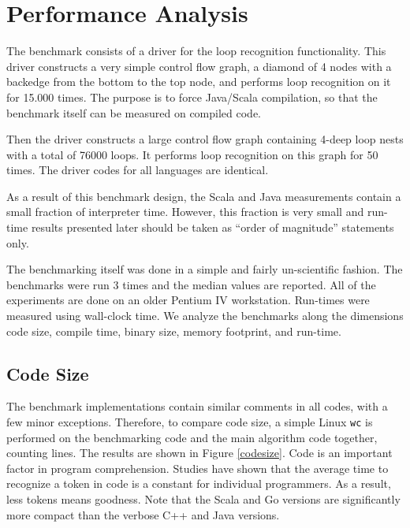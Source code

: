 \section{Performance Analysis}
\label{benchmark}

The benchmark consists of a driver for the loop recognition
functionality. This driver constructs a very simple control flow
graph, a diamond of 4 nodes with a backedge from the bottom to the
top node, and performs loop recognition on it for 15.000 times. 
The purpose is to force Java/Scala compilation, so that the benchmark 
itself can be measured on compiled code. 

Then the driver constructs a
large control flow graph containing 4-deep loop nests with a total of
76000 loops. It performs loop recognition on this graph for 50
times. The driver codes for all languages are identical.

As a result of this benchmark design, the Scala and Java measurements
contain a small fraction of interpreter time. However, this fraction
is very small and run-time results presented later should be
taken as ``order of magnitude'' statements only.

The benchmarking itself was done in a simple and fairly 
un-scientific fashion. The benchmarks were run 3 times and
the median values are reported. 
All of the experiments are done on an older Pentium IV workstation.
Run-times were measured using wall-clock time.
We analyze the benchmarks along the dimensions code size, compile time, binary
size, memory footprint, and run-time.

\subsection{Code Size}

The benchmark implementations contain similar comments in all codes,
with a few minor exceptions. Therefore, to compare code size, a simple
Linux {\tt wc} is performed on the benchmarking code and the main algorithm
code together, counting lines. The results are shown in Figure \ref{codesize}.
Code is an important factor in
program comprehension. Studies have shown that the average time to
recognize a token in code is a constant for individual programmers. As
a result, less tokens means goodness. Note that the Scala and Go
versions are significantly more compact than the verbose C++ and Java versions.

